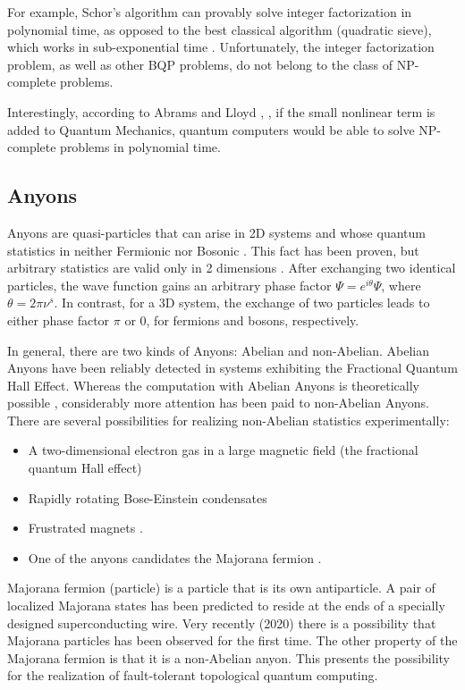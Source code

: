 For example, Schor's algorithm \cite{Schor} can provably solve integer factorization in polynomial time, as opposed to the best classical algorithm (quadratic sieve), which works in sub-exponential time \cite{Pomerance}. Unfortunately, the integer factorization problem, as well as other BQP problems, do not belong to the class of NP-complete problems. 

Interestingly, according to Abrams and Lloyd \cite{Abrams_1998}, \cite{Abrams_1999}, if the small nonlinear term is added to Quantum Mechanics, quantum computers would be able to solve NP-complete problems in polynomial time.

\subsection*{Anyons}
Anyons are quasi-particles that can arise in 2D systems and whose quantum statistics in neither Fermionic nor Bosonic \cite{Anyons1}. This fact has been proven\cite{Anyons2}, but
arbitrary statistics are valid only in 2 dimensions \cite{Walsh}. After exchanging two identical particles, the wave function gains an arbitrary phase factor $ \Psi = e^{i\theta}\Psi $, where $ \theta = 2\pi\nu^{s} $. In contrast, for a 3D system, the exchange of two particles leads to either phase factor $ \pi $ or $ 0 $, for fermions and bosons, respectively.

In general, there are two kinds of Anyons: Abelian and non-Abelian. Abelian Anyons have been reliably detected in systems exhibiting the Fractional Quantum Hall Effect\cite{FQHE}. Whereas the computation with Abelian Anyons is theoretically possible \cite{AbelianAnyons}, considerably more attention has been paid to non-Abelian Anyons.
There are several possibilities for realizing non-Abelian statistics experimentally: 
\begin{itemize}
  \item A two-dimensional electron gas in a large magnetic field (the fractional quantum Hall effect)
 \item Rapidly rotating Bose-Einstein condensates\cite{RrBeC} 
 \item Frustrated magnets \cite{FrMag}.
 \item One of the anyons candidates the Majorana fermion \cite{Majorana}. 
\end{itemize}
Majorana fermion (particle) is a particle that is its own antiparticle. A pair of localized Majorana states has been predicted to reside at the ends of a specially designed superconducting wire. Very recently (2020) \cite{Manna8775}
there is a possibility that Majorana particles has been observed for the first time. The other property of the Majorana fermion is that it is a non-Abelian anyon.
This presents the possibility for the realization of fault-tolerant topological quantum computing\cite{AnyonsTqc}. 



